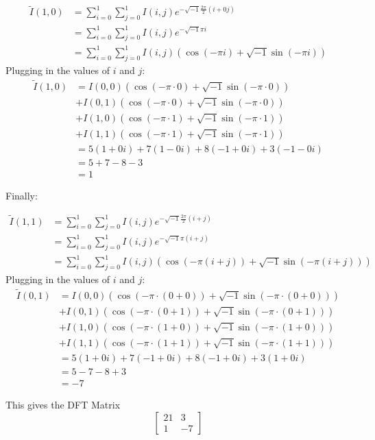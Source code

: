 \documentclass[a4paper]{article}
\begin{document}
	    	    \begin{align*}	     
	    \tilde{I}(1,0)&=\sum_{i=0}^1\sum_{j=0}^1I(i, j)e^{-\sqrt{-1}\frac{2\pi}{2}\left(i + 0j\right)}
			\\&=\sum_{i=0}^1\sum_{j=0}^1I(i,j)e^{-\sqrt{-1}\pi i}
			\\&=\sum_{i=0}^1\sum_{j=0}^1I(i,j)\left(\cos{\left(-\pi i\right)}+\sqrt{-1}\sin{\left(-\pi i\right)}\right)
	    \end{align*}
	    Plugging in the values of $i$ and $j$:
	    \begin{align*}
	    \tilde{I}(1,0)&=I(0,0)\left(\cos{\left(-\pi\cdot0\right)}+\sqrt{-1}\sin{\left(-\pi\cdot0\right)}\right)
			\\&+I(0,1)\left(\cos{\left(-\pi\cdot0\right)}+\sqrt{-1}\sin{\left(-\pi\cdot0\right)}\right)
			\\&+I(1,0)\left(\cos{\left(-\pi\cdot1\right)}+\sqrt{-1}\sin{\left(-\pi\cdot1\right)}\right)
			\\&+I(1,1)\left(\cos{\left(-\pi\cdot1\right)}+\sqrt{-1}\sin{\left(-\pi\cdot1\right)}\right)
			\\&=5\left(1+0i\right)+7\left(1-0i\right)+8\left(-1+0i\right)+3\left(-1-0i\right)
			\\&=5+7-8-3
			\\&=1
	    \end{align*}
	   
Finally:

	    \begin{align*}	     
	    \tilde{I}(1,1)&=\sum_{i=0}^1\sum_{j=0}^1I(i, j)e^{-\sqrt{-1}\frac{2\pi}{2}\left(i + j\right)}
			\\&=\sum_{i=0}^1\sum_{j=0}^1I(i,j)e^{-\sqrt{-1}\pi (i+j)}
			\\&=\sum_{i=0}^1\sum_{j=0}^1I(i,j)\left(\cos{\left(-\pi (i+j)\right)}+\sqrt{-1}\sin{\left(-\pi (i+j)\right)}\right)
	    \end{align*}
	    Plugging in the values of $i$ and $j$:
	    \begin{align*}
	    \tilde{I}(0,1)&=I(0,0)\left(\cos{\left(-\pi\cdot(0+0)\right)}+\sqrt{-1}\sin{\left(-\pi\cdot(0+0)\right)}\right)
			\\&+I(0,1)\left(\cos{\left(-\pi\cdot(0+1)\right)}+\sqrt{-1}\sin{\left(-\pi\cdot(0+1)\right)}\right)
			\\&+I(1,0)\left(\cos{\left(-\pi\cdot(1+0)\right)}+\sqrt{-1}\sin{\left(-\pi\cdot(1+0)\right)}\right)
			\\&+I(1,1)\left(\cos{\left(-\pi\cdot(1+1)\right)}+\sqrt{-1}\sin{\left(-\pi\cdot(1+1)\right)}\right)
			\\&=5\left(1+0i\right)+7\left(-1+0i\right)+8\left(-1+0i\right)+3\left(1+0i\right)
			\\&=5-7-8+3
			\\&=-7
	    \end{align*}
	     
This gives the DFT Matrix \[\begin{bmatrix}21&3\\1&-7\end{bmatrix}\]
\end{document}
